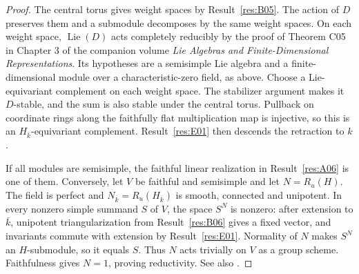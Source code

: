 \documentclass[11pt,a4paper,openany,oneside]{book}
\theoremstyle{resultstyle}
\theoremstyle{definition}
\numberwithin{equation}{chapter}
\begin{document}
\begin{proof}
The central torus gives weight spaces by Result~\ref{res:B05}.
The action of \(D\) preserves them and a submodule decomposes
by the same weight spaces. On each weight space,
\(\operatorname{Lie}(D)\) acts completely reducibly by the proof
of Theorem C05 in Chapter 3 of the companion volume
\emph{Lie Algebras and Finite-Dimensional Representations}.
Its hypotheses are a semisimple Lie algebra and a finite-dimensional
module over a characteristic-zero field, as above. Choose a
Lie-equivariant complement on each weight space. The stabilizer
argument makes it \(D\)-stable, and the sum is also stable under
the central torus. Pullback on coordinate rings along the
faithfully flat multiplication map is injective, so this is an
\(H_{\bar k}\)-equivariant complement. Result~\ref{res:E01}
then descends the retraction to \(k\).

If all modules are semisimple, the faithful linear realization in Result~\ref{res:A06} is one of them. Conversely, let \(V\) be faithful and semisimple and let \(N=R_u(H)\). The field is perfect and \(N_{\overline k}=R_u(H_{\overline k})\) is smooth, connected and unipotent. In every nonzero simple summand \(S\) of \(V\), the space \(S^N\) is nonzero: after extension to \(\overline k\), unipotent triangularization from Result~\ref{res:B06} gives a fixed vector, and invariants commute with extension by Result~\ref{res:E01}. Normality of \(N\) makes \(S^N\) an \(H\)-submodule, so it equals \(S\). Thus \(N\) acts trivially on \(V\) as a group scheme. Faithfulness gives \(N=1\), proving reductivity. See also \cite[22.39--22.42]{milne}.
\end{proof}
\end{document}
